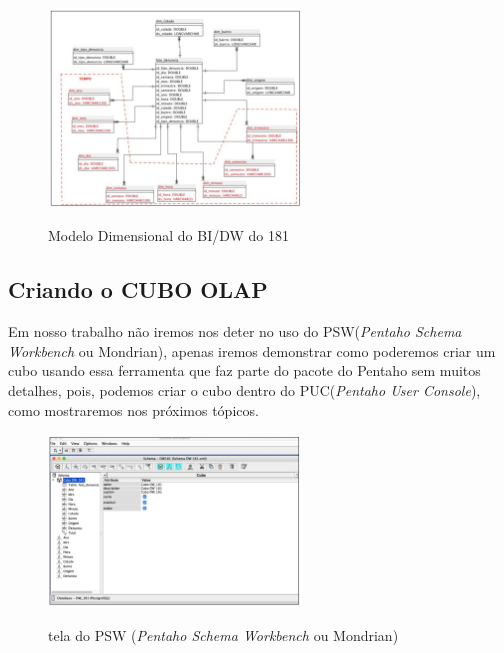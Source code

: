 \begin{figure}[H]
	\vspace*{0,2cm}
    \centering
    \caption{Modelo Dimensional do BI/DW do 181}
    \includegraphics[width=0.6\textwidth]{./04-figuras/figura-moddim}
    \label{fig:ilustfigmoddim}
\end{figure}
\vspace*{-0,9cm}
{\raggedright {}} 

\subsection{Criando o CUBO OLAP}

Em nosso trabalho n\~{a}o iremos nos deter no uso do PSW(\textit{Pentaho Schema Workbench} ou Mondrian), apenas iremos demonstrar como poderemos criar um cubo usando essa ferramenta que faz parte do pacote do Pentaho sem muitos detalhes, pois, podemos criar o cubo dentro do PUC(\textit{Pentaho User Console}), como mostraremos nos pr\'oximos t\'opicos.

\begin{figure}[H]
	\vspace*{0,2cm}
    \centering
    \caption{tela do PSW (\textit{Pentaho Schema Workbench} ou Mondrian)}
    \includegraphics[width=0.6\textwidth]{./04-figuras/figura-pentaho-psw}
    \label{fig:ilustfigpentaho-psw}
\end{figure}
\vspace*{-0,9cm}
{\raggedright {}} \\

